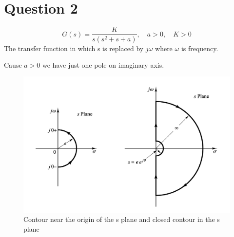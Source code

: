 \section{Question 2}
\begin{equation}
	G(s) = \dfrac{K}{s(s^2 + s + a)}, \quad a > 0, \quad K > 0
\end{equation}
The transfer function in which s is replaced by $j\omega$ where $\omega$ is frequency.

Cause $a>0$ we have just one pole on imaginary axis.
\begin{figure}[H]
	\caption{Contour near the origin of the s plane and closed contour in the s plane}
	\centering
	\includegraphics[width=12cm]{../Figure/Q2/nyquist_s_plane.png}
\end{figure}
